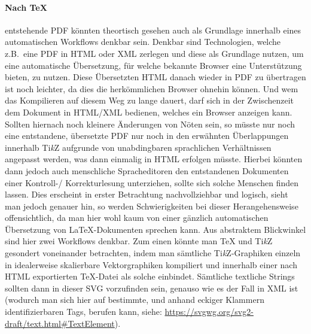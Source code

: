 \paragraph*{Nach TeX} entstehende PDF könnten theortisch gesehen auch als Grundlage innerhalb eines automatischen Workflows denkbar sein. Denkbar sind Technologien, welche z.B.\ eine PDF in HTML oder XML zerlegen und diese als Grundlage nutzen, um eine automatische Übersetzung, für welche bekannte Browser eine Unterstützung bieten, zu nutzen. Diese Übersetzten HTML danach wieder in PDF zu übertragen ist noch leichter, da dies die herkömmlichen Browser ohnehin können. Und wem das Kompilieren auf diesem Weg zu lange dauert, darf sich in der Zwischenzeit dem Dokument in HTML/XML bedienen, welches ein Browser anzeigen kann. Sollten hiernach noch kleinere Änderungen von Nöten sein, so müsste nur noch eine entstandene, übersetzte PDF nur noch in den erwähnten Überlappungen innerhalb Ti\textit{k}Z aufgrunde von unabdingbaren sprachlichen Verhältnissen angepasst werden, was dann einmalig in HTML erfolgen müsste. Hierbei könnten dann jedoch auch menschliche Spracheditoren den entstandenen Dokumenten einer Kontroll-/ Korrekturlesung unterziehen, sollte sich solche Menschen finden lassen. Dies erscheint in erster Betrachtung nachvollziehbar und logisch, sieht man jedoch genauer hin, so werden Schwierigkeiten bei dieser Herangehensweise offensichtlich, da man hier wohl kaum von einer gänzlich automatischen Übersetzung von \LaTeX{}-Dokumenten sprechen kann. Aus abstraktem Blickwinkel sind hier zwei Workflows denkbar. Zum einen könnte man \TeX{} und Ti\textit{k}Z gesondert voneinander betrachten, indem man sämtliche Ti\textit{k}Z-Graphiken einzeln in idealerweise skalierbare Vektorgraphiken kompiliert und innerhalb einer nach HTML exportierten \TeX{}-Datei als solche einbindet. Sämtliche textliche Strings sollten dann in dieser SVG vorzufinden sein, genauso wie es der Fall in XML ist (wodurch man sich hier auf bestimmte, und anhand eckiger Klammern identifizierbaren Tags, berufen kann, siehe: \url{https://svgwg.org/svg2-draft/text.html#TextElement}).%







